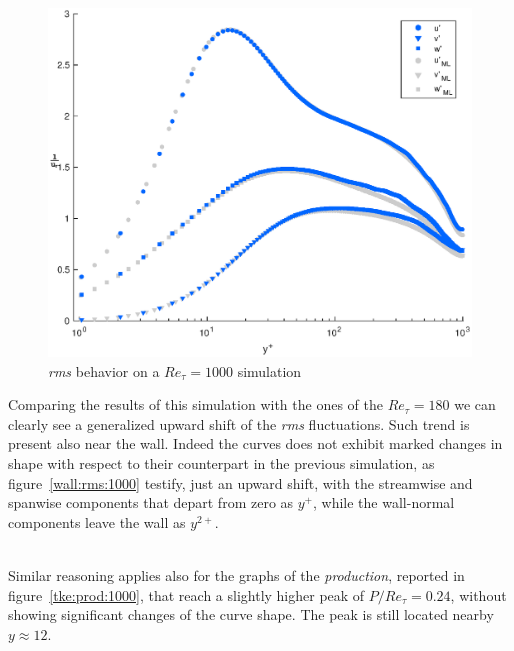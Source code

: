 \begin{figure}
\begin{center}
\includegraphics[scale=0.55]{grafici/rms_1000.eps}
\caption{\emph{rms} behavior on a $Re_{\tau}=1000$ simulation}
\label{rms:1000}
\end{center} 
\end{figure}

Comparing the results of this simulation with the ones of the $Re_{\tau}=180$ we can clearly see a generalized upward shift of the \emph{rms} fluctuations. Such trend is present also near the wall. Indeed the curves does not exhibit marked changes in shape with respect to their counterpart in the previous simulation, as figure~\ref{wall:rms:1000} testify, just an upward shift, with the streamwise and spanwise components that depart from zero as $y^{+}$, while the wall-normal components leave the wall as $y^{2+}$. \\~\par

Similar reasoning applies also for the graphs of the \emph{production}, reported in figure~\ref{tke:prod:1000}, that reach a slightly higher peak of $P/Re_{\tau}=0.24$, without showing significant changes of the curve shape. The peak is still located nearby $y\approx 12$.\\~\par


